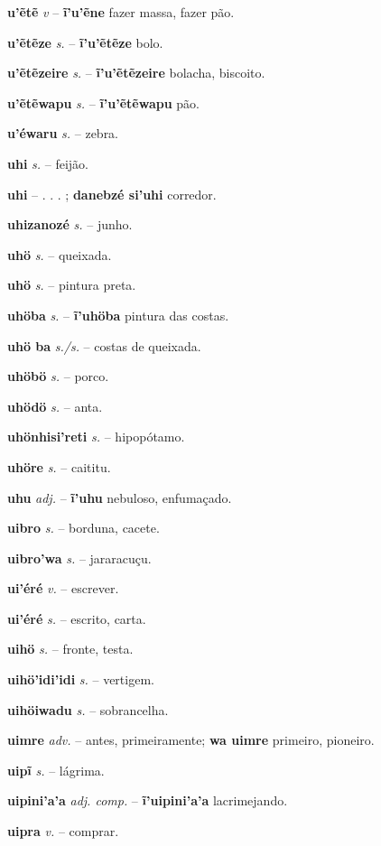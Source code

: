 \textbf{u'ẽtẽ} \textit{v} -- \textbf{ĩ'u'ẽne} fazer massa, fazer pão.

\textbf{u'ẽtẽze} \textit{s.} -- \textbf{ĩ'u'ẽtẽze} bolo.

\textbf{u'ẽtẽzeire} \textit{s.} -- \textbf{ĩ'u'ẽtẽzeire} bolacha, biscoito.

\textbf{u'ẽtẽwapu} \textit{s.} -- \textbf{ĩ'u'ẽtẽwapu} pão.

\textbf{u'éwaru} \textit{s.} -- zebra.

\textbf{uhi} \textit{s.} -- feijão.

\textbf{uhi} \textit{} -- . . . ; \textbf{danebzé si'uhi} corredor.

\textbf{uhizanozé} \textit{s.} -- junho.

\textbf{uhö} \textit{s.} -- queixada.

\textbf{uhö} \textit{s.} -- pintura preta.

\textbf{uhöba} \textit{s.} -- \textbf{ĩ'uhöba} pintura das costas.

\textbf{uhö ba} \textit{s./s.} -- costas de queixada.

\textbf{uhöbö} \textit{s.} -- porco.

\textbf{uhödö} \textit{s.} -- anta.

\textbf{uhönhisi'reti} \textit{s.} -- hipopótamo.

\textbf{uhöre} \textit{s.} -- caititu.

\textbf{uhu} \textit{adj.} -- \textbf{ĩ'uhu} nebuloso, enfumaçado.

\textbf{uibro} \textit{s.} -- borduna, cacete.

\textbf{uibro'wa} \textit{s.} -- jararacuçu.

\textbf{ui'éré} \textit{v.} -- escrever.

\textbf{ui'éré} \textit{s.} -- escrito, carta.

\textbf{uihö} \textit{s.} -- fronte, testa.

\textbf{uihö'idi'idi} \textit{s.} -- vertigem.

\textbf{uihöiwadu} \textit{s.} -- sobrancelha.

\textbf{uimre} \textit{adv.} -- antes, primeiramente; \textbf{wa uimre} primeiro, pioneiro.

\textbf{uipĩ} \textit{s.} -- lágrima.

\textbf{uipini'a'a} \textit{adj. comp.} -- \textbf{ĩ'uipini'a'a} lacrimejando.

\textbf{uipra} \textit{v.} -- comprar.

